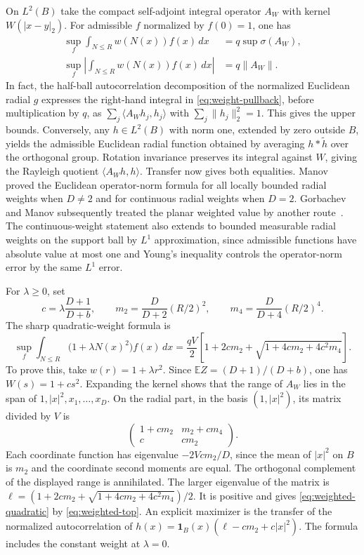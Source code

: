 \documentclass[11pt,a4paper]{article}
\numberwithin{equation}{section}
\begin{document}
On $L^2(B)$ take the compact self-adjoint integral operator $A_W$ with kernel $W(|x-y|_2)$. For admissible $f$ normalized by $f(0)=1$, one has
\begin{align}
 \sup_f\int_{N\le R}w(N(x))f(x)\,dx&=q\sup\sigma(A_W),
 \label{eq:weighted-top}\\
 \sup_f\left|\int_{N\le R}w(N(x))f(x)\,dx\right|&=q\|A_W\|.
 \label{eq:weighted-absolute}
\end{align}
In fact, the half-ball autocorrelation decomposition of the normalized Euclidean radial $g$ expresses the right-hand integral in \eqref{eq:weight-pullback}, before multiplication by $q$, as $\sum_j\langle A_Wh_j,h_j\rangle$ with $\sum_j\|h_j\|_2^2=1$. This gives the upper bounds. Conversely, any $h\in L^2(B)$ with norm one, extended by zero outside $B$, yields the admissible Euclidean radial function obtained by averaging $h*\widetilde h$ over the orthogonal group. Rotation invariance preserves its integral against $W$, giving the Rayleigh quotient $\langle A_Wh,h\rangle$. Transfer now gives both equalities. Manov \cite{Manov} proved the Euclidean operator-norm formula for all locally bounded radial weights when $D\ne2$ and for continuous radial weights when $D=2$. Gorbachev and Manov subsequently treated the planar weighted value by another route~\cite{GM}. The continuous-weight statement also extends to bounded measurable radial weights on the support ball by $L^1$ approximation, since admissible functions have absolute value at most one and Young's inequality controls the operator-norm error by the same $L^1$ error.

For $\lambda\ge0$, set
\[
 c=\lambda\frac{D+1}{D+b},\qquad
 m_2=\frac{D}{D+2}(R/2)^2,\qquad
 m_4=\frac{D}{D+4}(R/2)^4.
\]
The sharp quadratic-weight formula is
\begin{equation}
 \sup_f\int_{N\le R}\bigl(1+\lambda N(x)^2\bigr)f(x)\,dx
 =\frac{qV}{2}\left[1+2cm_2+\sqrt{1+4cm_2+4c^2m_4}\right].
 \label{eq:weighted-quadratic}
\end{equation}
To prove this, take $w(r)=1+\lambda r^2$. Since $\mathbb E Z=(D+1)/(D+b)$, one has $W(s)=1+cs^2$. Expanding the kernel shows that the range of $A_W$ lies in the span of $1,|x|^2,x_1,\ldots,x_D$. On the radial part, in the basis $(1,|x|^2)$, its matrix divided by $V$ is
\[
 \begin{pmatrix}1+cm_2&m_2+cm_4\\c&cm_2\end{pmatrix}.
\]
Each coordinate function has eigenvalue $-2Vcm_2/D$, since the mean of $|x|^2$ on $B$ is $m_2$ and the coordinate second moments are equal. The orthogonal complement of the displayed range is annihilated. The larger eigenvalue of the matrix is
$\ell=(1+2cm_2+\sqrt{1+4cm_2+4c^2m_4})/2$.
It is positive and gives \eqref{eq:weighted-quadratic} by \eqref{eq:weighted-top}. An explicit maximizer is the transfer of the normalized autocorrelation of $h(x)=\mathbf1_B(x)(\ell-cm_2+c|x|^2)$. The formula includes the constant weight at $\lambda=0$.
\end{document}
